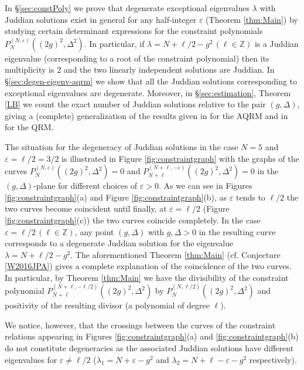 \documentclass[11pt]{article}
\numberwithin{equation}{section}
\newcommand{\Z}{\mathbb{Z}} %
\newcommand{\e}{\varepsilon}
\newcommand{\cp}[2]{P^{(#1)}_{#2}} %
\theoremstyle{plain}
\theoremstyle{definition}
\theoremstyle{remark}
\begin{document}
In \S \ref{sec:constPoly} we prove that degenerate exceptional eigenvalues \(\lambda\) with Juddian solutions
exist in general for any half-integer $\e$ (Theorem \ref{thm:Main}) by studying certain determinant expressions for
the constraint polynomials $\cp{N,\e}{N}((2g)^2,\Delta^2)$. In particular, if \(\lambda = N + \ell/2 -g^2 \, (\ell \in \Z) \)
is a Juddian eigenvalue (corresponding to a root of the constraint polynomial) then its multiplicity is \(2\) and
the two linearly independent solutions are Juddian. In \S\ref{sec:degen-eigenv-aqrm} we show that all the Juddian solutions corresponding to
exceptional eigenvalues are degenerate. Moreover, in \S \ref{sec:estimation}, Theorem \ref{LB} we count the exact number of Juddian
solutions relative to the pair \((g, \Delta)\), giving a (complete) generalization of the results given in \cite{LB2015JPA} for the AQRM and in
\cite{K1985JMP} for the QRM.

The situation for the degeneracy of Juddian solutions in the case \(N = 5\) and \(\e = \ell/2 = 3/2\) is illustrated in
Figure \ref{fig:constraintgraph} with the graphs of the curves \(\cp{N,\e}{N}((2g)^2,\Delta^2)=0\) and \(\cp{N+\ell,-\e}{N+\ell}((2g)^2,\Delta^2)=0\)
in the \((g,\Delta)\)-plane for different choices of \(\e > 0 \). As we can see in Figures \ref{fig:constraintgraph}(a)
and Figure \ref{fig:constraintgraph}(b), as \(\e\) tends to \(\ell/2\) the two curves become coincident until finally, at \(\e = \ell/2\)
(Figure \ref{fig:constraintgraph}(c)) the two curves coincide completely. In the case \(\e = \ell/2 \, (\ell \in \Z)\), any point \((g,\Delta)\) with \(g,\Delta>0\)
in the resulting curve corresponds to a degenerate Juddian solution for the eigenvalue \(\lambda = N + \ell/2 - g^2\).
The aforementioned Theorem \ref{thm:Main} (cf. Conjecture \ref{W2016JPA}) gives a complete explanation of the coincidence of
the two curves. In particular, by Theorem \ref{thm:Main} we have the divisibility of the constraint polynomial
$\cp{N+\ell,-\ell/2}{N+\ell}((2g)^2,\Delta^2)$ by $\cp{N,\ell/2}{N}((2g)^2,\Delta^2)$ and positivity of the resulting divisor (a polynomial of degree $\ell$).

We  notice, however, that the crossings between the curves of the constraint relations appearing in Figures \ref{fig:constraintgraph}(a)
and \ref{fig:constraintgraph}(b) do not constitute degeneracies as the associated Juddian solutions have different eigenvalues for \(\e \neq \ell/2 \)
(\(\lambda_1 = N + \e - g^2 \) and \(\lambda_2 = N + \ell - \e -g^2\) respectively).
\end{document}

